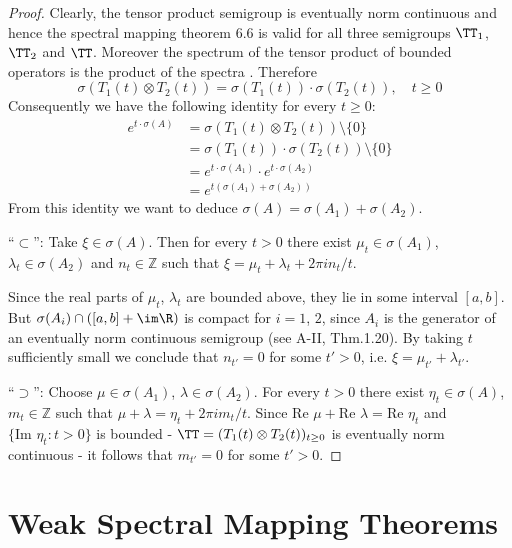 \begin{proof}
Clearly, the tensor product semigroup is eventually norm continuous and hence the spectral mapping theorem 6.6 is valid for all three semigroups $\TT_{1}$, $\TT_{2}$ and $\TT$.
Moreover the spectrum of the tensor product of bounded operators is the product of the spectra \citet[XIII.9]{reedsimon:1978}.
Therefore
\[
	\sigma(T_{1}(t)\otimes T_{2}(t)) = \sigma(T_{1}(t))\cdot\sigma(T_{2}(t)), \quad t \geq 0
\]
Consequently we have the following identity for every $t \geq 0$:
\begin{align*}
e^{t\cdot\sigma(A)} &= \sigma(T_{1}(t)\otimes T_{2}(t)) \setminus \{0\} \\
&= \sigma(T_{1}(t))\cdot\sigma(T_{2}(t)) \setminus \{0\} \\
&= e^{t\cdot\sigma(A_{1})}\cdot e^{t\cdot\sigma(A_{2})} \\
&= e^{t(\sigma(A_{1})+\sigma(A_{2}))}
\end{align*}
From this identity we want to deduce $\sigma(A) = \sigma(A_{1}) + \sigma(A_{2})$.

\enquote{$\subset$}: Take $\xi \in \sigma(A)$.
Then for every $t > 0$ there exist $\mu_{t} \in \sigma(A_{1})$, $\lambda_{t} \in \sigma(A_{2})$ and $n_{t} \in \mathbb{Z}$ such that $\xi = \mu_{t} + \lambda_{t} + 2\pi i n_{t}/t$.

Since the real parts of $\mu_{t}$, $\lambda_{t}$ are bounded above, they lie in some interval $[a,b]$.
But $\sigma(A_{i}) \cap ([a,b] + \im\R)$ is compact for $i = 1$, $2$, since $A_{i}$ is the generator of an eventually norm continuous semigroup (see A-II, Thm.1.20).
By taking $t$ sufficiently small we conclude that $n_{t'} = 0$ for some $t' > 0$, i.e. $\xi = \mu_{t'} + \lambda_{t'}$.

\enquote{$\supset$}: Choose $\mu \in \sigma(A_{1})$, $\lambda \in \sigma(A_{2})$.
For every $t > 0$ there exist $\eta_{t} \in \sigma(A)$, $m_{t} \in \mathbb{Z}$ such that $\mu + \lambda = \eta_{t} + 2\pi i m_{t}/t$.
Since $\text{Re }\mu + \text{Re }\lambda = \text{Re }\eta_{t}$ and $\{\text{Im }\eta_{t}: t > 0\}$ is bounded - $\TT = (T_{1}(t) \otimes T_{2}(t))_{t\geq 0}$ is eventually norm continuous - it follows that $m_{t'} = 0$ for some $t' > 0$.
\end{proof}

\section{Weak Spectral Mapping Theorems}\label{sec:a3-7}

